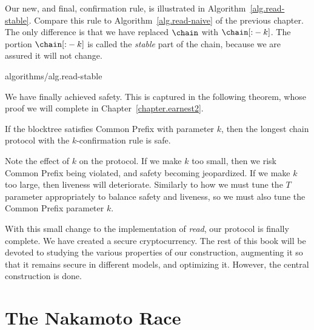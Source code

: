 Our new, and final, confirmation rule, is illustrated in
Algorithm~\ref{alg.read-stable}. Compare this rule to Algorithm~\ref{alg.read-naive} of
the previous chapter. The only difference is that we have replaced $\chain$ with $\chain[{:}-k]$.
The portion $\chain[{:}-k]$ is called the \emph{stable} part of the chain, because we
are assured it will not change.

{algorithms/alg.read-stable}

We have finally achieved safety. This is captured in the following theorem, whose proof we will
complete in Chapter~\ref{chapter.earnest2}.

\begin{theorem}
    If the blocktree satisfies Common Prefix with parameter $k$, then the longest chain protocol
    with the $k$-confirmation rule is safe.
\end{theorem}

Note the effect of $k$ on the protocol. If we make $k$ too small, then we risk Common Prefix
being violated, and safety becoming jeopardized. If we make $k$ too large, then liveness will
deteriorate. Similarly to how we must tune the $T$ parameter appropriately to balance safety
and liveness, so we must also tune the Common Prefix parameter $k$.

With this small change to the implementation of \emph{read}, our protocol is finally complete.
We have created a secure cryptocurrency. The rest of this book will be devoted to studying the
various properties of our construction, augmenting it so that it remains secure in different models,
and optimizing it. However, the central construction is done.

\section{The Nakamoto Race}

